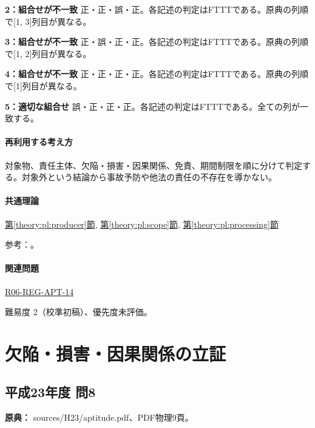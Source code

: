 \noindent\textbf{2：組合せが不一致} 正・正・誤・正。各記述の判定はFTTTである。原典の列順で[1, 3]列目が異なる。\par

\noindent\textbf{3：組合せが不一致} 正・誤・正・正。各記述の判定はFTTTである。原典の列順で[1, 2]列目が異なる。\par

\noindent\textbf{4：組合せが不一致} 正・正・正・正。各記述の判定はFTTTである。原典の列順で[1]列目が異なる。\par

\noindent\textbf{5：適切な組合せ} 誤・正・正・正。各記述の判定はFTTTである。全ての列が一致する。\par

\paragraph{再利用する考え方} 対象物、責任主体、欠陥・損害・因果関係、免責、期間制限を順に分けて判定する。対象外という結論から事故予防や他法の責任の不存在を導かない。

\paragraph{共通理論} \hyperref[theory:pl:producer]{第\ref*{theory:pl:producer}節}, \hyperref[theory:pl:scope]{第\ref*{theory:pl:scope}節}, \hyperref[theory:pl:processing]{第\ref*{theory:pl:processing}節}

\par 参考：\cite{pl_statute,pl_qa,pl_definitions2018}。

\paragraph{関連問題} \hyperref[q:r06-reg-apt-14]{R06-REG-APT-14}

\par 難易度 2（校準初稿）、優先度未評価。

\section{欠陥・損害・因果関係の立証}

\subsection{平成23年度 問8}
\label{q:h23-reg-apt-08}

\noindent\textbf{原典：} sources/H23/aptitude.pdf、PDF物理9頁。

